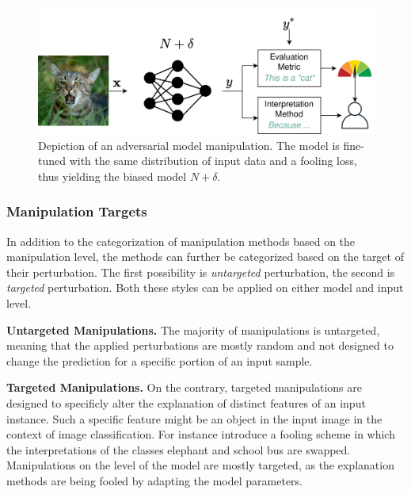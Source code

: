 \begin{figure}[ht]
    \centering
    \includegraphics[width=\linewidth]{figures/model_manipulations.png}
    \caption{Depiction of an adversarial model manipulation. The model is fine-tuned with the same distribution of input data and a fooling loss, thus yielding the biased model $N+\delta$.}
    \label{fig:input_manipulation}
    \vspace{-0.3cm}
\end{figure}

\subsubsection{Manipulation Targets}
\label{subsubsec:manipulation_targets}
In addition to the categorization of manipulation methods based on the manipulation level, the methods can further be categorized based on the target of their perturbation. The first possibility is \textit{untargeted} perturbation, the second is \textit{targeted} perturbation. Both these styles can be applied on either model and input level. 

\par\smallskip
\noindent\textbf{Untargeted Manipulations.} 
The majority of manipulations is untargeted, meaning that the applied perturbations are mostly random and not designed to change the prediction for a specific portion of an input sample. 

\par\smallskip
\noindent\textbf{Targeted Manipulations.} 
On the contrary, targeted manipulations are designed to specificly alter the explanation of distinct features of an input instance. Such a specific feature might be an object in the input image in the context of image classification. 
For instance \cite{fooling_nn_interpreters} introduce a fooling scheme in which the interpretations of the classes elephant and school bus are swapped. 
Manipulations on the level of the model are mostly targeted, as the explanation methods are being fooled by adapting the model parameters. 

